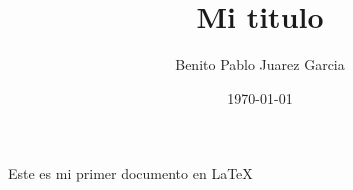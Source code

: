 \documentclass{article}
\title{Mi titulo}
\author{Benito Pablo Juarez Garcia}
\date{\today}
\begin{document}
\maketitle
Este es mi primer documento en \LaTeX
\end{document}
